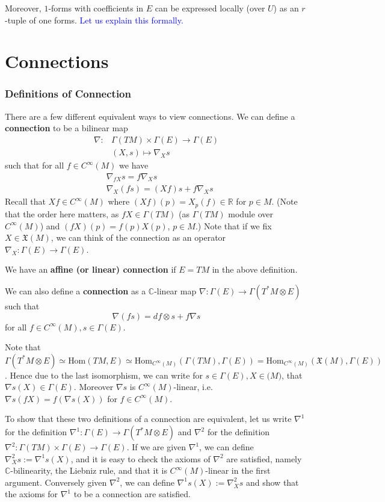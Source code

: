\documentclass[a4paper]{article}
\theoremstyle{definition} \newtheorem*{definition}{Definition}
\theoremstyle{definition} \newtheorem*{definitions}{Definitions}
\theoremstyle{plain} \newtheorem{theorem}{Theorem}[section]
\theoremstyle{plain} \newtheorem{proposition}[theorem]{Proposition}
\theoremstyle{plain} \newtheorem{corollary}[theorem]{Corollary}
\theoremstyle{plain} \newtheorem{lemma}[theorem]{Lemma}
\theoremstyle{plain} \newtheorem{example}[theorem]{Example}
\newcommand{\explainFurther}[1]{\textcolor{blue}{#1}}
\newcommand{\defn}[1]{\textbf{#1}}
\newcommand{\realnos}{\mathbb{R}}
\newcommand{\complexnos}{\mathbb{C}}
\newcommand{\Hom}{\text{Hom}}
\newcommand{\smooth}{C^\infty}
\begin{document}
Moreover,  $1$-forms with coefficients in $E$ can be expressed locally (over $U$) as an $r$-tuple of one forms.  \explainFurther{Let us explain this formally. }

\section{Connections}

\subsubsection{Definitions of Connection}

There are a few different equivalent ways to view connections.
We can define a \defn{connection} to be a bilinear map 
\begin{align*}
\nabla: & \Gamma(TM)\times \Gamma(E)\to \Gamma(E) \\
& (X, s)\mapsto \nabla_X s
\end{align*}
such that for all $f\in \smooth (M)$ we have
\begin{align*}
& \nabla_{fX}s=f\nabla_X s \\
& \nabla_X(fs)=(Xf)s + f\nabla_X s 
\end{align*}
Recall that $Xf\in \smooth(M)$ where $(Xf)(p)=X_p(f)\in \realnos$ for $p\in M$. (Note that the order here matters, as $fX\in \Gamma(TM)$ (as $\Gamma(TM)$ module over $\smooth(M)$) and $(fX)(p) = f(p)X(p)$, $p\in M$.) Note that if we fix 
$X\in \mathfrak{X}(M)$, we can think of the connection as an operator $\nabla_X:\Gamma(E)\to \Gamma(E)$.

We have an \defn{affine (or linear) connection} if $E=TM$ in the above definition.

We can also define a \defn{connection} as a $\complexnos$-linear map $\nabla : \Gamma(E)\to \Gamma(T^\ast M\otimes E)$ such that 
$$\nabla(fs)=df \otimes s + f\nabla s$$ 
for all $f\in C^\infty(M), s\in \Gamma(E)$.   

Note that $\Gamma(T^*M\otimes E)\simeq \Hom(TM, E)\simeq \Hom_{\smooth(M)}(\Gamma(TM), \Gamma(E)) = \Hom_{\smooth(M)}(\mathfrak{X}(M), \Gamma(E))$. Hence due to the last isomorphism, we can write for $s\in \Gamma(E), X\in \mathfrak(M)$, that $\nabla s(X)\in \Gamma(E)$. Moreover $\nabla s$ is $\smooth(M)$-linear, i.e. $\nabla s(fX)=f(\nabla s (X))$ for $f\in \smooth (M)$.

To show that these two definitions of a connection are equivalent, let us write $\nabla^1$ for the definition $\nabla^1:\Gamma(E)\to \Gamma(T^*M\otimes E)$ and $\nabla^2$ for the definition $\nabla^2:\Gamma(TM)\times \Gamma(E)\to \Gamma(E)$. If we are given $\nabla^1$, we can define $\nabla^2_X s:=\nabla^1 s(X)$, and it is easy to check the axioms of $\nabla^2$ are satisfied, namely $\complexnos$-bilinearity, the Liebniz rule, and that it is $\smooth(M)$-linear in the first argument. Conversely given $\nabla^2$, we can define $\nabla^1 s(X):=\nabla^2_X s$ and show that the axioms for $\nabla^1$ to be a connection are satisfied. 
\end{document}
